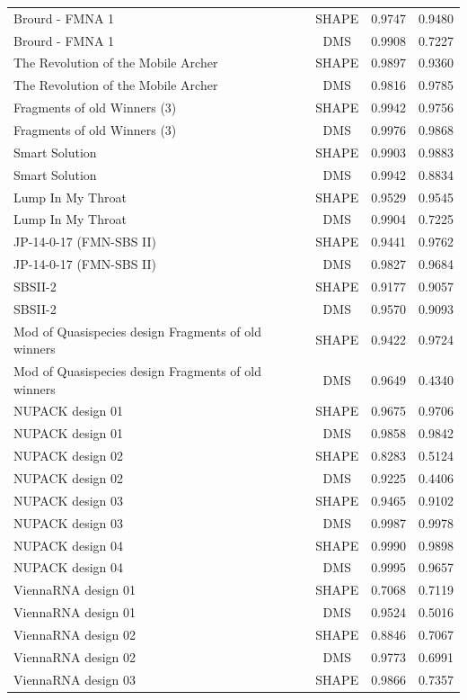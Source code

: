 \documentclass[letter]{bioinfo}
\begin{document}
\begin{center}
\begin{longtable}{lccc}
Brourd - FMNA 1	&	SHAPE	&	0.9747 	&	0.9480 	\\
Brourd - FMNA 1	&	DMS	&	0.9908 	&	0.7227 	\\
The Revolution of the Mobile Archer	&	SHAPE	&	0.9897 	&	0.9360 	\\
The Revolution of the Mobile Archer	&	DMS	&	0.9816 	&	0.9785 	\\
Fragments of old Winners (3)	&	SHAPE	&	0.9942 	&	0.9756 	\\
Fragments of old Winners (3)	&	DMS	&	0.9976 	&	0.9868 	\\
Smart Solution	&	SHAPE	&	0.9903 	&	0.9883 	\\
Smart Solution	&	DMS	&	0.9942 	&	0.8834 	\\
Lump In My Throat	&	SHAPE	&	0.9529 	&	0.9545 	\\
Lump In My Throat	&	DMS	&	0.9904 	&	0.7225 	\\
JP-14-0-17 (FMN-SBS II)	&	SHAPE	&	0.9441 	&	0.9762 	\\
JP-14-0-17 (FMN-SBS II)	&	DMS	&	0.9827 	&	0.9684 	\\
SBSII-2	&	SHAPE	&	0.9177 	&	0.9057 	\\
SBSII-2	&	DMS	&	0.9570 	&	0.9093 	\\
Mod of Quasispecies design Fragments of old winners	&	SHAPE	&	0.9422 	&	0.9724 	\\
Mod of Quasispecies design Fragments of old winners	&	DMS	&	0.9649 	&	0.4340 	\\
NUPACK design 01	&	SHAPE	&	0.9675 	&	0.9706 	\\
NUPACK design 01	&	DMS	&	0.9858 	&	0.9842 	\\
NUPACK design 02	&	SHAPE	&	0.8283 	&	0.5124 	\\
NUPACK design 02	&	DMS	&	0.9225 	&	0.4406 	\\
NUPACK design 03	&	SHAPE	&	0.9465 	&	0.9102 	\\
NUPACK design 03	&	DMS	&	0.9987 	&	0.9978 	\\
NUPACK design 04	&	SHAPE	&	0.9990 	&	0.9898 	\\
NUPACK design 04	&	DMS	&	0.9995 	&	0.9657 	\\
ViennaRNA design 01	&	SHAPE	&	0.7068 	&	0.7119 	\\
ViennaRNA design 01	&	DMS	&	0.9524 	&	0.5016 	\\
ViennaRNA design 02	&	SHAPE	&	0.8846 	&	0.7067 	\\
ViennaRNA design 02	&	DMS	&	0.9773 	&	0.6991 	\\
ViennaRNA design 03	&	SHAPE	&	0.9866 	&	0.7357 	\\

\end{longtable}
\end{center}
\end{document}
